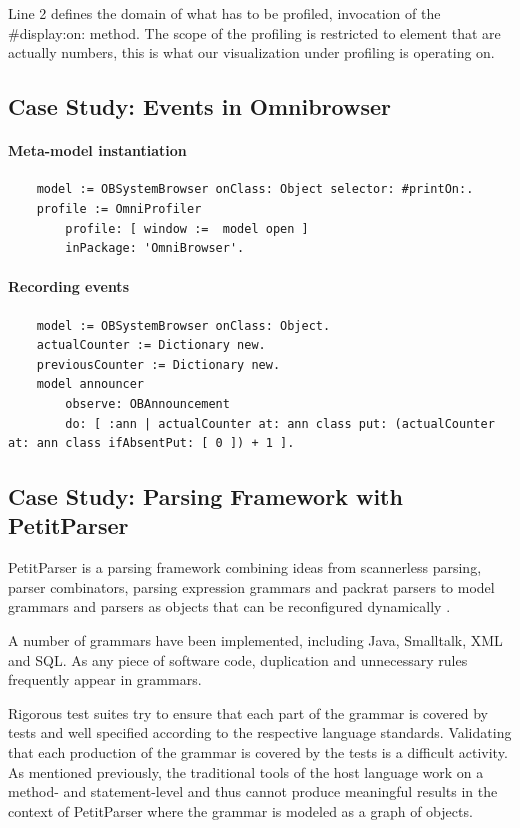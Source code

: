 \documentclass[runningheads]{llncs}
\begin{document}
Line 2 defines the domain of what has to be profiled, invocation of the {\sf \#display:on:} method. The scope of the profiling is restricted to element that are actually numbers, this is what our visualization under profiling is operating on. 

\subsection{Case Study: Events in Omnibrowser}

\paragraph{Meta-model instantiation}
\begin{lstlisting}
	model := OBSystemBrowser onClass: Object selector: #printOn:.
	profile := OmniProfiler 
		profile: [ window :=  model open ]
		inPackage: 'OmniBrowser'.
\end{lstlisting}

\paragraph{Recording events}
\begin{lstlisting}
	model := OBSystemBrowser onClass: Object.
	actualCounter := Dictionary new.
	previousCounter := Dictionary new.
	model announcer
		observe: OBAnnouncement
		do: [ :ann | actualCounter at: ann class put: (actualCounter at: ann class ifAbsentPut: [ 0 ]) + 1 ].
\end{lstlisting}


\subsection{Case Study: Parsing Framework with PetitParser}

PetitParser is a parsing framework combining ideas from scannerless parsing, parser combinators, parsing expression grammars and packrat parsers to model grammars and parsers as objects that can be reconfigured dynamically \cite{Reng10c}.

A number of grammars have been implemented, including Java, Smalltalk, XML and SQL. As any piece of software code, duplication and unnecessary rules frequently appear in grammars. 

Rigorous test suites try to ensure that each part of the grammar is covered by tests and well specified according to the respective language standards. Validating that each production of the grammar is covered by the tests is a difficult activity. As mentioned previously, the traditional tools of the host language work on a method- and statement-level and thus cannot produce meaningful results in the context of PetitParser where the grammar is modeled as a graph of objects.
\end{document}
